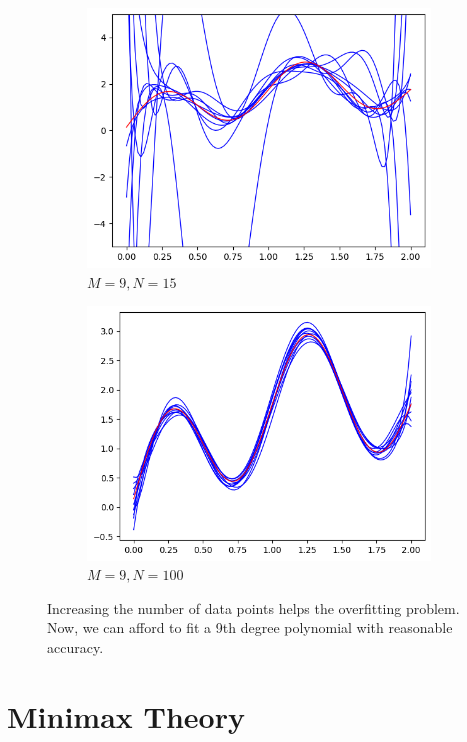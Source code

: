 \documentclass{article}
\begin{document}
\begin{example}
    \begin{figure}[H]
      \centering
      \begin{subfigure}[b]{0.48\textwidth}
      \centering
        \includegraphics[width=\textwidth]{img/poly_9_fit.png}
        \caption{$M = 9, N = 15$}
        \label{fig:less_points}
      \end{subfigure}
      \hfill 
      \begin{subfigure}[b]{0.48\textwidth}
      \centering
        \includegraphics[width=\textwidth]{img/increased_data.png}
        \caption{$M = 9, N = 100$}
        \label{fig:more_points}
      \end{subfigure}
      \caption{Increasing the number of data points helps the overfitting problem. Now, we can afford to fit a 9th degree polynomial with reasonable accuracy.}
      \label{fig:reducing_overfitting_with_more_samples}
    \end{figure}
    
  \end{example}

\section{Minimax Theory}
\end{document}
